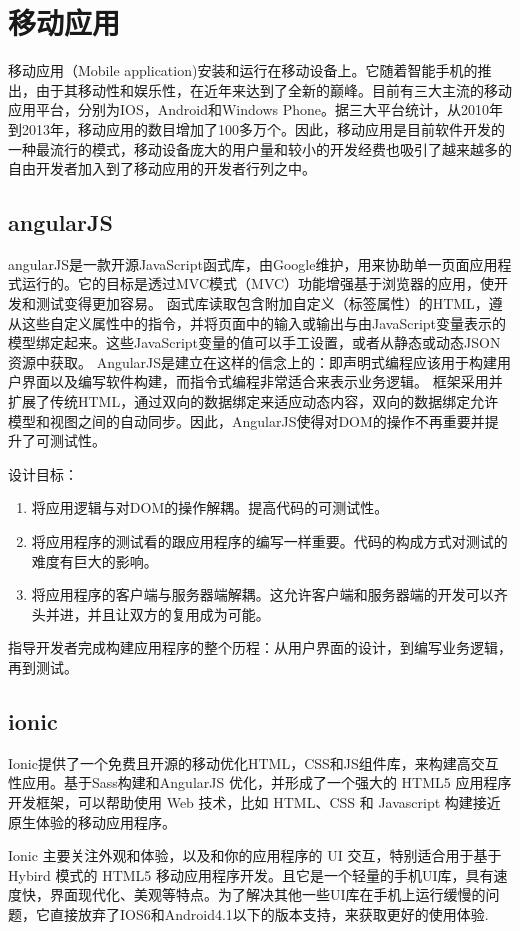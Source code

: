 \section{移动应用}
移动应用（Mobile application)安装和运行在移动设备上。它随着智能手机的推出，由于其移动性和娱乐性，在近年来达到了全新的巅峰。目前有三大主流的移动应用平台，分别为IOS，Android和Windows Phone。据三大平台统计，从2010年到2013年，移动应用的数目增加了100多万个。因此，移动应用是目前软件开发的一种最流行的模式，移动设备庞大的用户量和较小的开发经费也吸引了越来越多的自由开发者加入到了移动应用的开发者行列之中。
\subsection{angularJS}
angularJS是一款开源JavaScript函式库，由Google维护，用来协助单一页面应用程式运行的。它的目标是透过MVC模式（MVC）功能增强基于浏览器的应用，使开发和测试变得更加容易。
函式库读取包含附加自定义（标签属性）的HTML，遵从这些自定义属性中的指令，并将页面中的输入或输出与由JavaScript变量表示的模型绑定起来。这些JavaScript变量的值可以手工设置，或者从静态或动态JSON资源中获取。
AngularJS是建立在这样的信念上的：即声明式编程应该用于构建用户界面以及编写软件构建，而指令式编程非常适合来表示业务逻辑。 框架采用并扩展了传统HTML，通过双向的数据绑定来适应动态内容，双向的数据绑定允许模型和视图之间的自动同步。因此，AngularJS使得对DOM的操作不再重要并提升了可测试性。

设计目标：
\begin{enumerate}
\item 将应用逻辑与对DOM的操作解耦。提高代码的可测试性。
\item 将应用程序的测试看的跟应用程序的编写一样重要。代码的构成方式对测试的难度有巨大的影响。
\item 将应用程序的客户端与服务器端解耦。这允许客户端和服务器端的开发可以齐头并进，并且让双方的复用成为可能。
\end{enumerate}
指导开发者完成构建应用程序的整个历程：从用户界面的设计，到编写业务逻辑，再到测试。
\subsection{ionic}
Ionic\parencite{ionic}提供了一个免费且开源的移动优化HTML，CSS和JS组件库，来构建高交互性应用。基于Sass构建和AngularJS 优化，并形成了一个强大的 HTML5 应用程序开发框架，可以帮助使用 Web 技术，比如 HTML、CSS 和 Javascript 构建接近原生体验的移动应用程序。

Ionic 主要关注外观和体验，以及和你的应用程序的 UI 交互，特别适合用于基于 Hybird 模式的 HTML5 移动应用程序开发。且它是一个轻量的手机UI库，具有速度快，界面现代化、美观等特点。为了解决其他一些UI库在手机上运行缓慢的问题，它直接放弃了IOS6和Android4.1以下的版本支持，来获取更好的使用体验.


